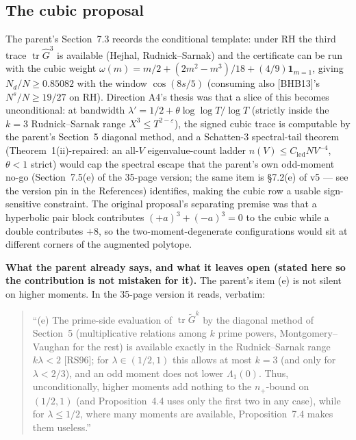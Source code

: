 \documentclass[11pt]{article}
\theoremstyle{plain}
\theoremstyle{definition}
\theoremstyle{remark}
\newcommand{\Gh}{\widehat{G}}
\newcommand{\tr}{\operatorname{tr}}
\newcommand{\Cled}{C_{\mathrm{led}}}
\newcommand{\Nd}{N_{d}}
\newcommand{\one}{\mathbf{1}}
\begin{document}
\subsection{The cubic proposal}

The parent's Section~7.3 records the conditional template: under RH the third
trace $\tr \Gh^3$ is available (Hejhal, Rudnick--Sarnak) and the certificate can
be run with the cubic weight
$\omega(m) = m/2 + (2m^2 - m^3)/18 + (4/9)\one_{m = 1}$, giving
$\Nd/N \ge 0.85082$ with the window $\cos(8s/5)$ (consuming also [BHB13]'s
$N^s/N \ge 19/27$ on RH). Direction A4's thesis was that a slice of this becomes
unconditional: at bandwidth
$\lambda' = 1/2 + \theta \log\log T/\log T$ (strictly inside the $k = 3$
Rudnick--Sarnak range $X^3 \le T^{2 - \varepsilon}$), the signed cubic trace is
computable by the parent's Section~5 diagonal method, and a Schatten-$3$
spectral-tail theorem (Theorem~1(ii)-repaired: an all-$V$ eigenvalue-count ladder
$n(V) \le \Cled N V^{-4}$, $\theta < 1$ strict) would cap the spectral escape that
the parent's own odd-moment no-go (Section~7.5(e) of the 35-page version; the
same item is \S7.2(e) of v5 --- see the version pin in the References)
identifies, making the cubic row a usable sign-sensitive constraint. The original proposal's separating
premise was that a hyperbolic pair block contributes
$(+a)^3 + (-a)^3 = 0$ to the cubic while a double contributes $+8$, so the
two-moment-degenerate configurations would sit at different corners of the
augmented polytope.

\textbf{What the parent already says, and what it leaves open (stated here so
the contribution is not mistaken for it).} The parent's item (e) is not silent
on higher moments. In the 35-page version it reads, verbatim:

\begin{quote}
``(e) The prime-side evaluation of $\tr \widetilde{G}^k$ by the diagonal method
of Section~5 (multiplicative relations among $k$ prime powers,
Montgomery--Vaughan for the rest) is available exactly in the Rudnick--Sarnak
range $k\lambda < 2$ [RS96]; for $\lambda \in (1/2, 1)$ this allows at most
$k = 3$ (and only for $\lambda < 2/3$), and an odd moment does not lower
$\Lambda_1(0)$. Thus, unconditionally, higher moments add nothing to the
$n_+$-bound on $(1/2, 1)$ (and Proposition~4.4 uses only the first two in any
case), while for $\lambda \le 1/2$, where many moments are available,
Proposition~7.4 makes them useless.''
\end{quote}
\end{document}
